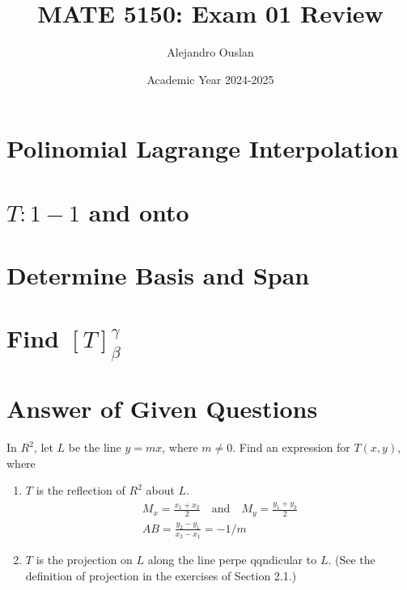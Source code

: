\documentclass[10pt, oneside]{article}
\title{MATE 5150: Exam 01 Review}
\author{Alejandro Ouslan}
\date{Academic Year 2024-2025}
\begin{document}
\maketitle
\tableofcontents

\vspace{.25in}

\section{Polinomial Lagrange Interpolation}

\section{$T: 1-1$ and onto}

\section{Determine Basis and Span}

\section{Find $[T]_{\beta}^{\gamma}$}

\section{Answer of Given Questions}

In $R^2$, let $L$ be the line $y = mx$, where $m \neq 0$. Find an expression for $T(x, y)$, where
\begin{enumerate}
	\item $T$ is the reflection of $R^2$ about $L$.
	      \[
		      \begin{split}
			      M_x = \frac{x_1 + x_2}{2} \quad \text{and} \quad M_y = \frac{y_1 + y_2}{2} \\
			      AB = \frac{y_2 - y_1}{x_2 - x_1} = -1/m
		      \end{split}
	      \]
	\item $T$ is the projection on $L$ along the line perpe qqndicular to $L$. (See the definition of projection in the exercises of Section 2.1.)
\end{enumerate}
\end{document}
